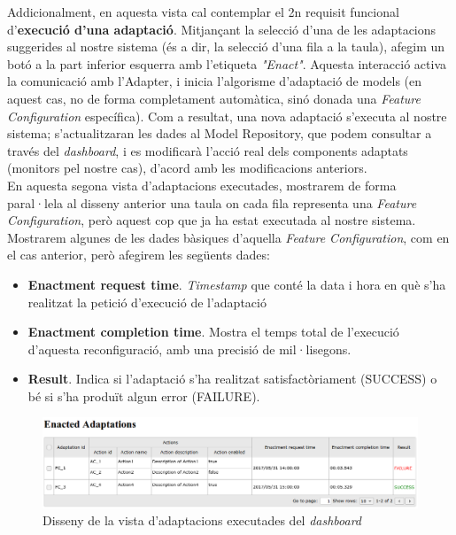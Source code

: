 Addicionalment, en aquesta vista cal contemplar el 2n requisit funcional d'\textbf{execució d'una adaptació}. Mitjançant la selecció d'una de les adaptacions suggerides al nostre sistema (és a dir, la selecció d'una fila a la taula), afegim un botó a la part inferior esquerra amb l'etiqueta \textit{"Enact"}. Aquesta interacció activa la comunicació amb l'Adapter, i inicia l'algorisme d'adaptació de models (en aquest cas, no de forma completament automàtica, sinó donada una \textit{Feature Configuration} específica). Com a resultat, una nova adaptació s'executa al nostre sistema; s'actualitzaran les dades al Model Repository, que podem consultar a través del \textit{dashboard}, i es modificarà l'acció real dels components adaptats (monitors pel nostre cas), d'acord amb les modificacions anteriors.\\

En aquesta segona vista d'adaptacions executades, mostrarem de forma paral·lela al disseny anterior una taula on cada fila representa una \textit{Feature Configuration}, però aquest cop que ja ha estat executada al nostre sistema. Mostrarem algunes de les dades bàsiques d'aquella \textit{Feature Configuration}, com en el cas anterior, però afegirem les següents dades:

\begin{itemize}
\item \textbf{Enactment request time}. \textit{Timestamp} que conté la data i hora en què s'ha realitzat la petició d'execució de l'adaptació
\item \textbf{Enactment completion time}. Mostra el temps total de l'execució d'aquesta reconfiguració, amb una precisió de mil·lisegons. 
\item \textbf{Result}. Indica si l'adaptació s'ha realitzat satisfactòriament (SUCCESS) o bé si s'ha produït algun error (FAILURE).
\end{itemize}

\begin{figure}
\centering
\includegraphics[width=14cm]{Figures/Figure33}
\decoRule
\caption{Disseny de la vista d'adaptacions executades del \textit{dashboard}}
\label{fig:Figura33}
\end{figure} 

